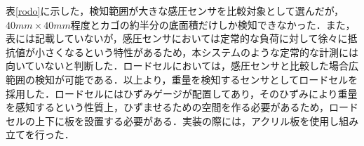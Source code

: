 表\ref{rodo}に示した，検知範囲が大きな感圧センサを比較対象として選んだが，$40mm\times40mm$程度とカゴの約半分の底面積だけしか検知できなかった．また，表には記載していないが，感圧センサにおいては定常的な負荷に対して徐々に抵抗値が小さくなるという特性があるため，本システムのような定常的な計測には向いていないと判断した．ロードセルにおいては，感圧センサと比較した場合広範囲の検知が可能である．以上より，重量を検知するセンサとしてロードセルを採用した．ロードセルにはひずみゲージが配置してあり，そのひずみにより重量を感知するという性質上，ひずませるための空間を作る必要があるため，ロードセルの上下に板を設置する必要がある．実装の際には，アクリル板を使用し組み立てを行った．
